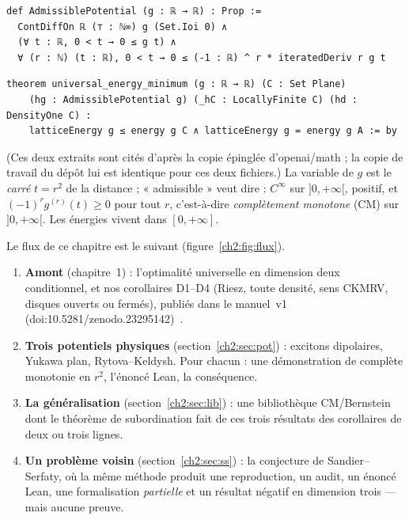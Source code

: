 \begin{leanbox}
\begin{lstlisting}[style=chdeux]
def AdmissiblePotential (g : ℝ → ℝ) : Prop :=
  ContDiffOn ℝ (⊤ : ℕ∞) g (Set.Ioi 0) ∧
  (∀ t : ℝ, 0 < t → 0 ≤ g t) ∧
  ∀ (r : ℕ) (t : ℝ), 0 < t → 0 ≤ (-1 : ℝ) ^ r * iteratedDeriv r g t
\end{lstlisting}
\end{leanbox}
\begin{leanbox}
\begin{lstlisting}[style=chdeux]
theorem universal_energy_minimum (g : ℝ → ℝ) (C : Set Plane)
    (hg : AdmissiblePotential g) (_hC : LocallyFinite C) (hd : DensityOne C) :
    latticeEnergy g ≤ energy g C ∧ latticeEnergy g = energy g A := by
\end{lstlisting}
\end{leanbox}
\noindent (Ces deux extraits sont cités d'après la copie épinglée d'openai/math ; la copie de travail
 du dépôt lui est identique pour ces deux fichiers.) La variable de $g$ est le \emph{carré} $t=r^2$ de la
distance ; « admissible » veut dire : $C^\infty$ sur $]0,+\infty[$, positif, et $(-1)^r g^{(r)}(t)\ge0$ pour tout $r$,
c'est-à-dire \emph{complètement monotone} (CM) sur $]0,+\infty[$. Les énergies vivent dans $[0,+\infty]$.

Le flux de ce chapitre est le suivant (figure~\ref{ch2:fig:flux}).
\begin{enumerate}[itemsep=1pt]
\item \textbf{Amont} (chapitre~1) : l'optimalité universelle en dimension deux \tierA{} conditionnel, et nos corollaires
D1--D4 (Riesz, toute densité, sens CKMRV, disques ouverts ou fermés), publiés dans le manuel~v1
(doi\string:10.5281/zenodo.23295142)~\cite{v1}.
\item \textbf{Trois potentiels physiques} (section~\ref{ch2:sec:pot}) : excitons dipolaires, Yukawa plan, Rytova--Keldysh.
Pour chacun : une démonstration de complète monotonie en $r^2$, l'énoncé Lean, la conséquence.
\item \textbf{La généralisation} (section~\ref{ch2:sec:lib}) : une bibliothèque CM/Bernstein dont le théorème de
subordination fait de ces trois résultats des corollaires de deux ou trois lignes.
\item \textbf{Un problème voisin} (section~\ref{ch2:sec:ss}) : la conjecture de Sandier--Serfaty, où la même méthode
produit une reproduction, un audit, un énoncé Lean, une formalisation \emph{partielle} et un résultat négatif en
dimension trois --- mais aucune preuve.
\end{enumerate}


